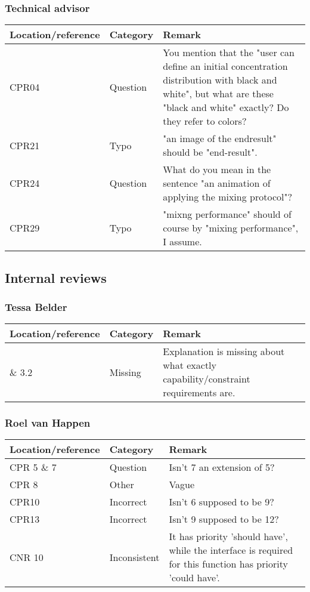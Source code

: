 \subsubsection*{Technical advisor}
\begin{longtable}{l|l|p{}}
Location/reference & Category & Remark\\
\hline
\hline
\endhead
\hline
\endfoot
CPR04 & Question & You mention that the "user can define an initial concentration distribution with black and white", but what are these "black and white" exactly? Do they refer to colors? \\
CPR21 & Typo & "an image of the endresult" should be "end-result".\\
CPR24 & Question &What do you mean in the sentence "an animation of applying the mixing protocol"?\\
CPR29 & Typo & "mixng performance" should of course by "mixing performance", I assume. \\
\end{longtable}

\subsection{Internal reviews}

\subsubsection*{Tessa Belder}
\begin{longtable}{l|l|p{}}
Location/reference & Category & Remark\\
\hline
\hline
\endhead
\hline
\endfoot
3.1 \& 3.2 & Missing & Explanation is missing about what exactly capability/constraint requirements are.\\
\end{longtable}

\subsubsection*{Roel van Happen}
\begin{longtable}{l|l|p{}}
Location/reference & Category & Remark\\
\hline
\hline
\endhead
\hline
\endfoot
CPR 5 \& 7 & Question & Isn't 7 an extension of 5?\\
CPR 8 & Other & Vague\\
CPR10 & Incorrect & Isn't 6 supposed to be 9?\\
CPR13 & Incorrect & Isn't 9 supposed to be 12?\\
CNR 10 & Inconsistent & It has priority 'should have', while the interface is required for this function has priority 'could have'.\\
\end{longtable}

